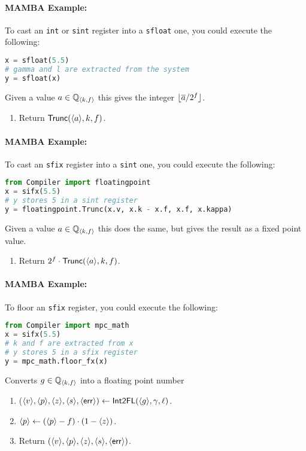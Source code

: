 \paragraph{MAMBA Example:} To cast an \verb|int| or \verb|sint| register into a \verb|sfloat| one, you could execute the following: 
\begin{lstlisting}[language={python}]
x = sfloat(5.5)
# gamma and l are extracted from the system
y = sfloat(x)
\end{lstlisting}

Given a value $a \in {\mathbb{Q}}_{\langle k, f \rangle}$ this gives the integer
${\lfloor \overline{a}/2^f \rfloor}$.
\begin{enumerate}
\item Return $\mathsf{Trunc}(\langle a \rangle,k,f)$.
\end{enumerate}

\paragraph{MAMBA Example:} To cast an \verb|sfix| register into a \verb|sint| one, you could execute the following: 
\begin{lstlisting}[language={python}]
from Compiler import floatingpoint
x = sifx(5.5)
# y stores 5 in a sint register
y = floatingpoint.Trunc(x.v, x.k - x.f, x.f, x.kappa)
\end{lstlisting}
Given a value $a \in {\mathbb{Q}}_{\langle k, f \rangle}$ this does the same, but
gives the result as a fixed point value.
\begin{enumerate}
\item Return $2^f \cdot \mathsf{Trunc}(\langle a \rangle,k,f)$.
\end{enumerate}
\paragraph{MAMBA Example:} To floor an \verb|sfix| register, you could execute the following: 
\begin{lstlisting}[language={python}]
from Compiler import mpc_math
x = sifx(5.5)
# k and f are extracted from x
# y stores 5 in a sfix register
y = mpc_math.floor_fx(x)
\end{lstlisting}

Converts $g \in {\mathbb{Q}}_{\langle k, f \rangle}$ into a floating point number
\begin{enumerate}
\item ($\langle v \rangle,\langle p \rangle,\langle z \rangle,\langle s \rangle,\langle \mathsf{err} \rangle)
	\leftarrow \mathsf{Int2FL}(\langle g \rangle,\gamma,\ell)$.
\item $\langle p \rangle \leftarrow (\langle p \rangle-f) \cdot (1-\langle z \rangle)$.
\item Return $(\langle v \rangle,\langle p \rangle,\langle z \rangle,\langle s \rangle,\langle \mathsf{err} \rangle)$.
\end{enumerate}
